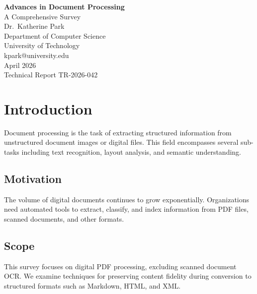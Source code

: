 \documentclass[12pt]{report}
\begin{document}
\begin{titlepage}
\centering
\vspace*{2cm}
{\Huge\bfseries Advances in Document Processing\\[0.5cm]}
{\Large A Comprehensive Survey\\[2cm]}
{\large Dr.\ Katherine Park\\[0.3cm]}
{\normalsize Department of Computer Science\\
University of Technology\\
kpark@university.edu\\[2cm]}
{\large April 2026\\[3cm]}
{\small Technical Report TR-2026-042}
\end{titlepage}

\begin{abstract}
This report provides a comprehensive survey of document processing techniques,
covering optical character recognition, layout analysis, semantic classification,
and content extraction. We examine the evolution from rule-based systems to modern
deep learning approaches, identifying key challenges in handling diverse document
formats. Our analysis covers 150 papers published between 2015 and 2025, revealing
trends toward end-to-end learning systems and multimodal architectures.
\end{abstract}

\chapter{Introduction}
Document processing is the task of extracting structured information from
unstructured document images or digital files. This field encompasses several
sub-tasks including text recognition, layout analysis, and semantic understanding.

\section{Motivation}
The volume of digital documents continues to grow exponentially. Organizations
need automated tools to extract, classify, and index information from PDF files,
scanned documents, and other formats.

\section{Scope}
This survey focuses on digital PDF processing, excluding scanned document OCR.
We examine techniques for preserving content fidelity during conversion to
structured formats such as Markdown, HTML, and XML.
\end{document}
